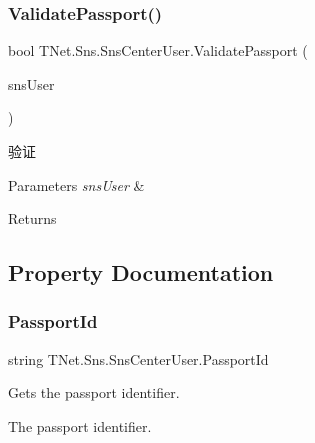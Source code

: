 \subsubsection{\texorpdfstring{Validate\+Passport()}{ValidatePassport()}}
{\footnotesize\ttfamily bool T\+Net.\+Sns.\+Sns\+Center\+User.\+Validate\+Passport (\begin{DoxyParamCaption}\item[{\mbox{\hyperlink{class_t_net_1_1_sns_1_1_sns_user}{Sns\+User}}}]{sns\+User }\end{DoxyParamCaption})}



验证 


\begin{DoxyParams}{Parameters}
{\em sns\+User} & \\
\hline
\end{DoxyParams}
\begin{DoxyReturn}{Returns}

\end{DoxyReturn}


\subsection{Property Documentation}
\mbox{\label{class_t_net_1_1_sns_1_1_sns_center_user_abf70c3bed11cd1f81afe5ba30e483412}} 
\subsubsection{\texorpdfstring{Passport\+Id}{PassportId}}
{\footnotesize\ttfamily string T\+Net.\+Sns.\+Sns\+Center\+User.\+Passport\+Id\hspace{0.3cm}{\ttfamily [get]}}



Gets the passport identifier. 

The passport identifier.\mbox{\label{class_t_net_1_1_sns_1_1_sns_center_user_a9063f05c104fcc146a8a87bafadf5eea}} 
